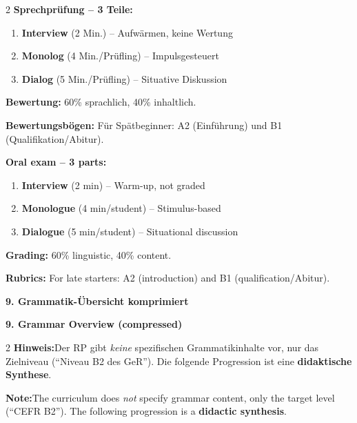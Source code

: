 \documentclass[10pt,a4paper]{article}
\newcommand{\secbil}[2]{%
\vspace{6pt}
\noindent\colorbox{spaet}{\parbox{0.48\textwidth}{\color{white}\bfseries\small #1}}%
\hfill%
\colorbox{english}{\parbox{0.48\textwidth}{\color{white}\bfseries\small #2}}
\vspace{3pt}
}
\begin{document}
\begin{paracol}{2}
\small
\textbf{Sprechprüfung -- 3 Teile:}\footnotemark[9]
\begin{enumerate}[noitemsep,topsep=2pt]
\item \textbf{Interview} (2 Min.) -- Aufwärmen, keine Wertung
\item \textbf{Monolog} (4 Min./Prüfling) -- Impulsgesteuert
\item \textbf{Dialog} (5 Min./Prüfling) -- Situative Diskussion
\end{enumerate}

\textbf{Bewertung:} 60\% sprachlich, 40\% inhaltlich.

\textbf{Bewertungsbögen:} Für Spätbeginner: A2 (Einführung) und B1 (Qualifikation/Abitur).

\switchcolumn

\small\color{english}
\textbf{Oral exam -- 3 parts:}\footnotemark[9]
\begin{enumerate}[noitemsep,topsep=2pt]
\item \textbf{Interview} (2 min) -- Warm-up, not graded
\item \textbf{Monologue} (4 min/student) -- Stimulus-based
\item \textbf{Dialogue} (5 min/student) -- Situational discussion
\end{enumerate}

\textbf{Grading:} 60\% linguistic, 40\% content.

\textbf{Rubrics:} For late starters: A2 (introduction) and B1 (qualification/Abitur).

\end{paracol}


\secbil{9. Grammatik-Übersicht komprimiert}{9. Grammar Overview (compressed)}

\vspace{2mm}

\begin{paracol}{2}
\scriptsize
\textbf{Hinweis:}\footnotemark[10] Der RP gibt \textit{keine} spezifischen Grammatikinhalte vor, nur das Zielniveau (``Niveau B2 des GeR''). Die folgende Progression ist eine \textbf{didaktische Synthese}.

\switchcolumn

\scriptsize\color{english}
\textbf{Note:}\footnotemark[10] The curriculum does \textit{not} specify grammar content, only the target level (``CEFR B2''). The following progression is a \textbf{didactic synthesis}.

\end{paracol}
\end{document}
